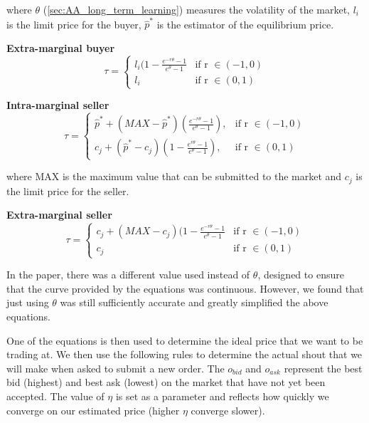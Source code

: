 \documentclass{acm_proc_article-sp}
\begin{document}
where $\theta$ (\ref{sec:AA_long_term_learning}) measures the volatility of the
market, $l_i$ is the limit price for the buyer, $\hat{p}^*$ is the estimator of the
equilibrium price.

\textbf{Extra-marginal buyer}
\begin{equation}
\tau =
\begin{cases}
      l_i(1-\frac{e^{-r\theta}-1}{e^\theta-1} &  \text{if r } \in (-1,0)  \\
      l_i & \text{if r } \in (0,1)
\end{cases}
\label{extrabuyer}
\end{equation}

\textbf{Intra-marginal seller}
\begin{equation}
\label{intraseller}
\tau =
\begin{cases}
      \hat{p}^* + (MAX-\hat{p}^*)( \frac{e^{-r\theta}-1}{e^{\theta}-1}), &  \text{if r } \in (-1,0)  \\
      c_j + (\hat{p}^*-c_j)(1-\frac{e^{r\theta}-1}{e^\theta-1}), & \text{if r } \in (0,1)
\end{cases}
\end{equation}

where MAX is the maximum value that can be submitted to the market and $c_j$ is
the limit price for the seller.

\textbf{Extra-marginal seller}
\begin{equation}
\tau =
\begin{cases}
      c_j + (MAX-c_j)(1-\frac{e^{-r\theta}-1}{e^\theta-1} &  \text{if r } \in (-1,0)  \\
      c_j & \text{if r } \in (0,1)
\end{cases}
\label{extraseller}
\end{equation}

In the paper, there was a different value used instead of $\theta$, designed to
ensure that the curve provided by the equations was continuous. However, we
found that just using $\theta$ was still sufficiently accurate and greatly
simplified the above equations.

One of the equations is then used to determine the ideal price that we want to
be trading at. We then use the following rules to determine the actual shout
that we will make when asked to submit a new order. The $o_{bid}$ and $o_{ask}$
represent the best bid (highest) and best ask (lowest) on the market that have
not yet been accepted. The value of $\eta$ is set as a parameter and reflects
how quickly we converge on our estimated price (higher $\eta$ converge slower).
\end{document}

